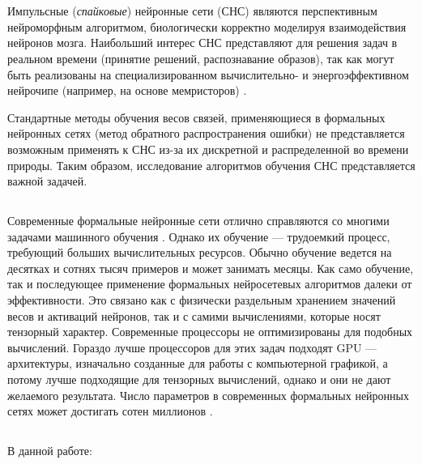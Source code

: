 \documentclass[a4paper]{article}
\begin{document}
\thispagestyle{empty}

\tableofcontents

\clearpage 

\section{}
Импульсные (\textit{спайковые}) нейронные сети (СНС) являются перспективным нейроморфным алгоритмом, биологически корректно моделируя взаимодействия нейронов мозга. Наибольший интерес СНС представляют для решения задач в реальном времени (принятие решений, распознавание образов), так как могут быть реализованы на специализированном вычислительно- и энергоэффективном нейрочипе (например, на основе мемристоров) \cite{hardware1, hardware2}.

Стандартные методы обучения весов связей, применяющиеся в формальных нейронных сетях (метод обратного распространения ошибки) не представляется возможным применять к СНС из-за их дискретной и распределенной во времени природы. Таким образом, исследование алгоритмов обучения СНС представляется важной задачей.

\subsection{}
Современные формальные нейронные сети отлично справляются со многими задачами машинного обучения \cite{pmlr-v28-wan13}. Однако их обучение --- трудоемкий процесс, требующий больших вычислительных ресурсов. Обычно обучение ведется на десятках и сотнях тысяч примеров и может занимать месяцы. Как само обучение, так и последующее применение формальных нейросетевых алгоритмов далеки от эффективности. Это связано как с физически раздельным хранением значений весов и активаций нейронов, так и с самими вычислениями, которые носят тензорный характер. Современные процессоры не оптимизированы для подобных вычислений. Гораздо лучше процессоров для этих задач подходят GPU --- архитектуры, изначально созданные для работы с компьютерной графикой, а потому лучше подходящие для тензорных вычислений, однако и они не дают желаемого результата. Число параметров в современных формальных нейронных сетях может достигать сотен миллионов \cite{ManyParams}.

\subsection{}
В данной работе:
\end{document}
